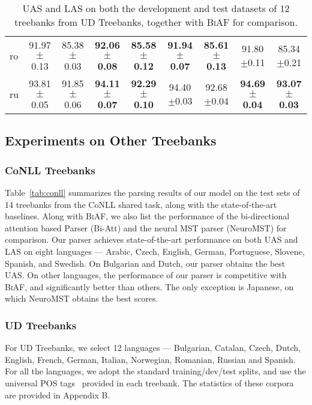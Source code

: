 \documentclass[11pt,a4paper]{article}
\begin{document}
\begin{table*}[t]
{\begin{tabular}[t]{l|c:c|c:c||c:c|c:c}
ro & 91.97$\pm$0.13 & 85.38$\pm$0.03 & \textbf{92.06$\pm$0.08} & \textbf{85.58$\pm$0.12} & \textbf{91.94$\pm$0.07} & \textbf{85.61$\pm$0.13} & 91.80$\pm$0.11 & 85.34$\pm$0.21 \\
ru & 93.81$\pm$0.05 & 91.85$\pm$0.06 & \textbf{94.11$\pm$0.07} & \textbf{92.29$\pm$0.10} & 94.40$\pm$0.03 & 92.68$\pm$0.04 & \textbf{94.69$\pm$0.04} & \textbf{93.07$\pm$0.03} \\
\hline
\end{tabular}
}
\caption{UAS and LAS on both the development and test datasets of 12 treebanks from UD Treebanks, together with \textsc{BiAF} for comparison.}
\label{tab:udt}
\end{table*}

\subsection{Experiments on Other Treebanks}\label{subsec:experiment:other}
\subsubsection{CoNLL Treebanks}
Table~\ref{tab:conll} summarizes the parsing results of our model on the test sets of 14 treebanks from the CoNLL shared task, along with the state-of-the-art
baselines. 
Along with \textsc{BiAF}, we also list the performance of the bi-directional attention based Parser (\textsf{Bi-Att}) \citep{cheng-EtAl:2016:EMNLP2016} and the neural MST parser (\textsf{NeuroMST}) \citep{ma-hovy:2017:I17-1} for comparison. 
Our parser achieves state-of-the-art performance on both UAS and LAS on 
eight languages --- Arabic, Czech, English, German, Portuguese, Slovene, Spanish, and Swedish. 
On Bulgarian and Dutch, our parser obtains the best UAS.
On other languages, the performance of our parser is competitive with \textsc{BiAF}, and significantly better than others.
The only exception is Japanese, on which \textsf{NeuroMST} obtains the best scores.

\subsubsection{UD Treebanks} 
For UD Treebanks, we select 12 languages --- Bulgarian, Catalan, Czech, Dutch, English, French, German, Italian, Norwegian, Romanian, Russian and Spanish. 
For all the languages, we adopt the standard training/dev/test splits, and use the universal POS tags~\citep{PETROV12.274.L12-1115} provided in each treebank. 
The statistics of these corpora are provided in Appendix B.
\end{document}
